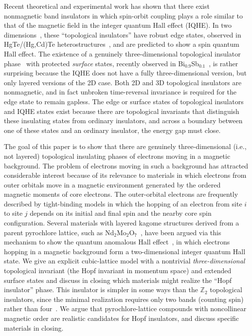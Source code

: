 \documentclass[prl,showpacs,superscriptaddress,twocolumn,preprintnumbers,amssymb,amsfonts]{revtex4}
\begin{document}

Recent theoretical and experimental work has shown that there exist nonmagnetic band insulators in which spin-orbit coupling plays a role similar to that of the magnetic field in the integer quantum Hall effect (IQHE).  In two dimensions~\cite{km2}, these ``topological insulators'' have robust edge states, observed in HgTe/(Hg,Cd)Te heterostructures~\cite{molenkampscience}, and are predicted to show a spin quantum Hall effect.  The existence of a genuinely three-dimensional topological insulator phase~\cite{fu&kane&mele-2007,moore&balents-2006,rroy3D} with protected {\it surface} states,
recently observed in Bi$_{0.9}$Sb$_{0.1}$~\cite{hsieh},
is rather surprising because the IQHE does not have a fully three-dimensional version, but only layered versions of the 2D case.  Both 2D and 3D topological insulators are nonmagnetic, and in fact unbroken time-reversal invariance is required for the edge state to remain gapless.  The edge or surface states of topological insulators and IQHE states exist because there are topological invariants that distinguish these insulating states from ordinary insulators, and across a boundary between one of these states and an ordinary insulator, the energy gap must close.

The goal of this paper is to show that there are genuinely three-dimensional (i.e., not layered)
topological insulating phases of electrons moving in a magnetic background.
The problem of electrons moving in such a background has attracted
considerable interest because of its relevance to materials in which
electrons from outer orbitals move in a magnetic environment generated by the
ordered magnetic moments of core electrons.  The outer-orbital electrons are
frequently described by tight-binding models in which the
hopping of an electron from site $i$ to site $j$ depends on its initial and
final spin and the nearby core spin configuration.  Several materials with layered kagome structures derived from a parent pyrochlore lattice, such as Nd$_2$Mo$_2$O$_7$~\cite{taguchi}, have been argued via this mechanism to show the quantum anomalous Hall effect~\cite{ohgushi,kagomeahe}, in which electrons hopping in a magnetic background form a two-dimensional integer quantum Hall state.  We give an explicit cubic-lattice model with a nontrivial {\it three-dimensional} topological invariant (the
Hopf invariant in momentum space) and extended surface states and discuss in
closing which materials might realize the ``Hopf insulator'' phase.  This
insulator is simpler in some ways than the $\mathbb{Z}_2$ topological
insulators, since the minimal realization requires only two bands (counting
spin) rather than four~\cite{moore&balents-2006}.  We argue that pyrochlore-lattice compounds with noncollinear magnetic order are realistic candidates for Hopf insulators, and discuss specific materials in closing.
\end{document}
